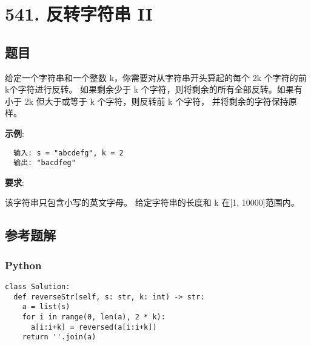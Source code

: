 \newpage
\section{541. 反转字符串 II}
\label{leetcode:541}

\subsection{题目}

给定一个字符串和一个整数 k，你需要对从字符串开头算起的每个 2k 个字符的前k个字符进行反转。
如果剩余少于 k 个字符，则将剩余的所有全部反转。如果有小于 2k 但大于或等于 k 个字符，则反转前 k 个字符，
并将剩余的字符保持原样。

\textbf{示例}:

\begin{verbatim}
  输入: s = "abcdefg", k = 2
  输出: "bacdfeg"
\end{verbatim}

\textbf{要求}:

该字符串只包含小写的英文字母。
给定字符串的长度和 k 在[1, 10000]范围内。

\subsection{参考题解}

\subsubsection{Python}

\begin{verbatim}
class Solution:
  def reverseStr(self, s: str, k: int) -> str:
    a = list(s)
    for i in range(0, len(a), 2 * k):
      a[i:i+k] = reversed(a[i:i+k])
    return ''.join(a)
\end{verbatim}
